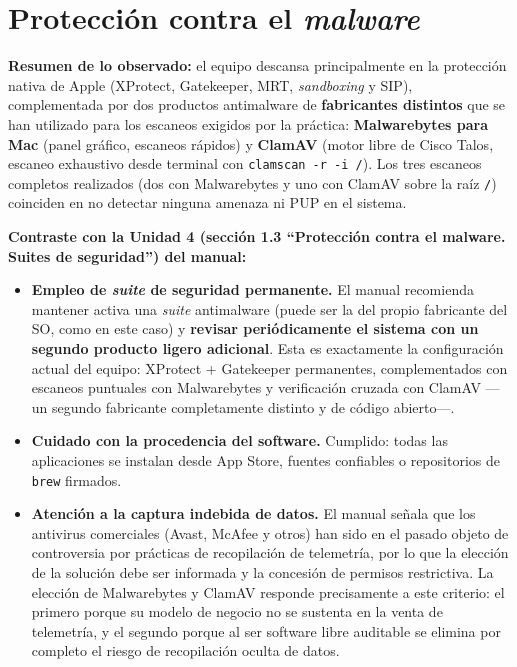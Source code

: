 \section{Protección contra el \textit{malware}}
\label{sec:concl-malware}

\textbf{Resumen de lo observado:} el equipo descansa principalmente en la protección nativa de Apple (XProtect, Gatekeeper, MRT, \textit{sandboxing} y SIP), complementada por dos productos antimalware de \textbf{fabricantes distintos} que se han utilizado para los escaneos exigidos por la práctica: \textbf{Malwarebytes para Mac} (panel gráfico, escaneos rápidos) y \textbf{ClamAV} (motor libre de Cisco Talos, escaneo exhaustivo desde terminal con \texttt{clamscan -r -i /}). Los tres escaneos completos realizados (dos con Malwarebytes y uno con ClamAV sobre la raíz \texttt{/}) coinciden en no detectar ninguna amenaza ni PUP en el sistema.

\textbf{Contraste con la Unidad 4 (sección 1.3 ``Protección contra el malware. Suites de seguridad'') del manual:}

\begin{itemize}[leftmargin=*]
    \item \textbf{Empleo de \textit{suite} de seguridad permanente.} El manual recomienda mantener activa una \textit{suite} antimalware (puede ser la del propio fabricante del SO, como en este caso) y \textbf{revisar periódicamente el sistema con un segundo producto ligero adicional}. Esta es exactamente la configuración actual del equipo: XProtect + Gatekeeper permanentes, complementados con escaneos puntuales con Malwarebytes y verificación cruzada con ClamAV ---un segundo fabricante completamente distinto y de código abierto---.
    \item \textbf{Cuidado con la procedencia del software.} Cumplido: todas las aplicaciones se instalan desde App Store, fuentes confiables o repositorios de \texttt{brew} firmados.
    \item \textbf{Atención a la captura indebida de datos.} El manual señala que los antivirus comerciales (Avast, McAfee y otros) han sido en el pasado objeto de controversia por prácticas de recopilación de telemetría, por lo que la elección de la solución debe ser informada y la concesión de permisos restrictiva. La elección de Malwarebytes y ClamAV responde precisamente a este criterio: el primero porque su modelo de negocio no se sustenta en la venta de telemetría, y el segundo porque al ser software libre auditable se elimina por completo el riesgo de recopilación oculta de datos.
\end{itemize}

